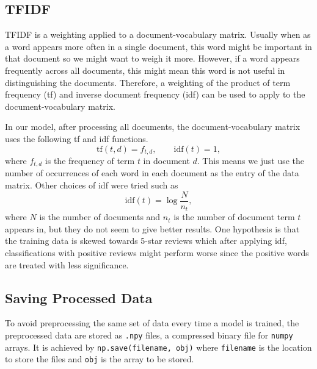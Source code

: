 \documentclass[12pt]{article}
\theoremstyle{remark}
\begin{document}
\subsection{TFIDF}
TFIDF is a weighting applied to a document-vocabulary matrix. Usually when as a word appears more often in a single document, this word might be important in that document so we might want to weigh it more. However, if a word appears frequently across all documents, this might mean this word is not useful in distinguishing the documents. Therefore, a weighting of the product of term frequency (tf) and inverse document frequency (idf) can be used to apply to the document-vocabulary matrix.

In our model, after processing all documents, the document-vocabulary matrix uses the following tf and idf functions.
\[
	\text{tf}(t, d) = f_{t,d}, \qquad \text{idf}(t) = 1,
\]
where \(f_{t,d}\) is the frequency of term \(t\) in document \(d\). This means we just use the number of occurrences of each word in each document as the entry of the data matrix. Other choices of idf were tried such as \[
	\text{idf}(t) = \log \frac{N}{n_t},
\]
where \(N\) is the number of documents and \(n_t\) is the number of document term \(t\) appears in, but they do not seem to give better results. One hypothesis is that the training data is skewed towards 5-star reviews which after applying idf, classifications with positive reviews might perform worse since the positive words are treated with less significance.

\begin{center}
\end{center}


\subsection{Saving Processed Data}
To avoid preprocessing the same set of data every time a model is trained, the preprocessed data are stored as \texttt{.npy} files, a compressed binary file for \texttt{numpy} arrays. It is achieved by \lstinline[language=python]{np.save(filename, obj)} where \texttt{filename} is the location to store the files and \texttt{obj} is the array to be stored.
\end{document}
